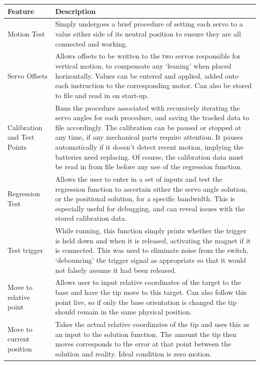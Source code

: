 \documentclass[11pt]{article}
\begin{document}
\begin{center}
\label{table:keyFeatures}
\begin{tabularx}{0.95\textwidth}{|p{10em}|X|}
\hline
\textbf{Feature} & \textbf{Description}
\\
\hline
Motion Test & Simply undergoes a brief procedure of setting each servo to a value either side of its neutral position to ensure they are all connected and working.
\\
\hline
Servo Offsets & Allows offsets to be written to the two servos responsible for vertical motion, to compensate any `leaning' when placed horizontally. Values can be entered and applied, added onto each instruction to the corresponding motor. Can also be stored to file and read in on start-up.
\\
\hline
Calibration and Test Points & Runs the procedure associated with recursively iterating the servo angles for each procedure, and saving the tracked data to file accordingly. The calibration can be paused or stopped at any time, if any mechanical parts require attention. It pauses automatically if it doesn't detect recent motion, implying the batteries need replacing. Of course, the calibration data must be read in from file before any use of the regression function.
\\
\hline
Regression Test & Allows the user to enter in a set of inputs and test the regression function to ascertain either the servo angle solution, or the positional solution, for a specific bandwidth. This is especially useful for debugging, and can reveal issues with the stored calibration data.
\\
\hline
Test trigger & While running, this function simply prints whether the trigger is held down and when it is released, activating the magnet if it is connected. This was used to eliminate noise from the switch, `debouncing' the trigger signal as appropriate so that it would not falsely assume it had been released.
\\
\hline
Move to relative point & Allows user to input relative coordinates of the target to the base and have the tip move to this target. Can also follow this point live, so if only the base orientation is changed the tip should remain in the same physical position.
\\
\hline
Move to current \newline position & Takes the actual relative coordinates of the tip and uses this as an input to the solution function. The amount the tip then moves corresponds to the error at that point between the solution and reality. Ideal condition is zero motion.

\end{tabularx}
\end{center}
\end{document}
